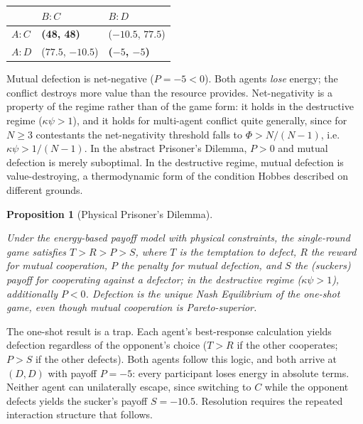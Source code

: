 \documentclass[11pt]{article}
\theoremstyle{plain}
\newtheorem{proposition}[theorem]{Proposition}
\theoremstyle{definition}
\theoremstyle{remark}
\newcounter{none}
\begin{document}
{\def\LTcaptype{none} %
\begin{longtable}[]{@{}lll@{}}
\toprule\noalign{}
& \(B: C\) & \(B: D\) \\
\midrule\noalign{}
\endhead
\bottomrule\noalign{}
\endlastfoot
\(A: C\) & \textbf{(48, 48)} & (\(-10.5\), \(77.5\)) \\
\(A: D\) & (\(77.5\), \(-10.5\)) & \textbf{(\(-5\), \(-5\))} \\
\end{longtable}
}

Mutual defection is net-negative (\(P = -5 < 0\)). Both agents
\emph{lose} energy; the conflict destroys more value than the resource
provides. Net-negativity is a property of the regime rather than of the
game form: it holds in the destructive regime (\(\kappa\psi > 1\)), and
it holds for multi-agent conflict quite generally, since for
\(N \geq 3\) contestants the net-negativity threshold falls to
\(\Phi > N/(N-1)\), i.e.~\(\kappa\psi > 1/(N-1)\). In the abstract
Prisoner's Dilemma, \(P > 0\) and mutual defection is merely suboptimal.
In the destructive regime, mutual defection is value-destroying, a
thermodynamic form of the condition Hobbes \citep{Hobbes1651} described
on different grounds.

\begin{proposition}[Physical Prisoner's Dilemma]
\label{ethics-prop-physical-pd}

Under the energy-based payoff model with physical constraints, the single-round game satisfies $T > R > P > S$, where $T$ is the temptation to defect, $R$ the reward for mutual cooperation, $P$ the penalty for mutual defection, and $S$ the (suckers) payoff for cooperating against a defector; in the destructive regime ($\kappa\psi > 1$), additionally $P < 0$. Defection is the unique Nash Equilibrium of the one-shot game, even though mutual cooperation is Pareto-superior. \citep{TC-V}
\end{proposition}

The one-shot result is a trap. Each agent's best-response calculation
yields defection regardless of the opponent's choice (\(T > R\) if the
other cooperates; \(P > S\) if the other defects). Both agents follow
this logic, and both arrive at \((D, D)\) with payoff \(P = -5\): every
participant loses energy in absolute terms. Neither agent can
unilaterally escape, since switching to \(C\) while the opponent defects
yields the sucker's payoff \(S = -10.5\). Resolution requires the
repeated interaction structure that follows.
\end{document}
